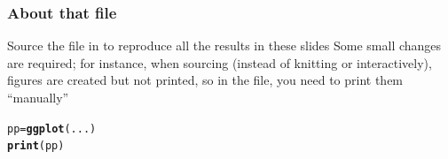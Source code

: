 \documentclass[aspectratio=169]{beamer}\usepackage[]{graphicx}\usepackage[]{xcolor}
\makeatletter
\newcommand{\hldef}[1]{\textcolor[rgb]{0.345,0.345,0.345}{#1}}%
\newcommand{\hlkwb}[1]{\textcolor[rgb]{0.69,0.353,0.396}{#1}}%
\newcommand{\hlkwd}[1]{\textcolor[rgb]{0.737,0.353,0.396}{\textbf{#1}}}%
\newenvironment{kframe}{%
 \def\at@end@of@kframe{}%
 \ifinner\ifhmode%
  \def\at@end@of@kframe{\end{minipage}}%
  \begin{minipage}{\columnwidth}%
 \fi\fi%
 \def\FrameCommand##1{\hskip\@totalleftmargin \hskip-\fboxsep
 \colorbox{shadecolor}{##1}\hskip-\fboxsep
     \hskip-\linewidth \hskip-\@totalleftmargin \hskip\columnwidth}%
 \MakeFramed {\advance\hsize-\width
   \@totalleftmargin\z@ \linewidth\hsize
   \@setminipage}}%
 {\par\unskip\endMakeFramed%
 \at@end@of@kframe}
\newenvironment{knitrout}{}{} %
\makeatother
\begin{document}
\begin{frame}[fragile]\frametitle{About that  file}
Source the file  in  to reproduce all the results in these slides
\vfill
Some small changes are required; for instance, when sourcing (instead of knitting or interactively),  figures are created but not printed, so in the  file, you need to print them ``manually''
\vfill
\begin{knitrout}
\color{fgcolor}\begin{kframe}
\begin{alltt}
\hldef{pp} \hlkwb{=} \hlkwd{ggplot}\hldef{(...)}
\hlkwd{print}\hldef{(pp)}
\end{alltt}
\end{kframe}
\end{knitrout}
\end{frame}
\end{document}
